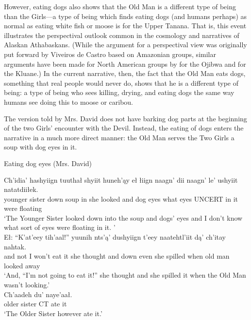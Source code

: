 However, eating dogs also shows that the Old Man is a different type of being than the Girls—a type of being which finds eating dogs (and humans perhaps) as normal as eating white fish or moose is for the Upper Tanana. That is, this event illustrates the perspectival \citep{ViveirosDeCastroE1998} outlook common in the cosmology and narratives of Alaskan Athabaskans. (While the argument for a perspectival view was originally put forward by Viveiros de Castro based on Amazonian groups, similar arguments have been made for North American groups by \citet{IngoldT2000} for the Ojibwa and \citet{NadasdyP2003} for the Kluane.) In the current narrative, then, the fact that the Old Man eats dogs, something that real people would never do, shows that he is a different type of being: a type of being who sees killing, drying, and eating dogs the same way humans see doing this to moose or caribou.

The version told by Mrs. David does not have barking dog parts at the beginning of the two Girls' encounter with the Devil. Instead, the eating of dogs enters the narrative in a much more direct manner: the Old Man serves the Two Girls a soup with dog eyes in it.

\begin{exe}
\ex Eating dog eyes (Mrs. David) \label{brucks:cdavid-dogs-eyes}
\begin{xlist}

\ex \gll Ch'idia' hashyiign tuuthał shyiit huneh'ąy eł łiign naagn' dii naagn' le' ushyiit natatdiiłek.   \\
 {younger sister} down soup in {she looked} and dog eyes what eyes UNCERT {in it} {were floating} \\
\glt `The Younger Sister looked down into the soup and dogs' eyes and I don't know what sort of eyes were floating in it. ' \\

\ex \gll Eł: ``K'at'eey tih'aal!'' yuunih nts'ą' dushyiign t'eey naatehtl'iit dą' ch'itay nahtak.  \\
 and not {I won't eat it} {she thought} and down even {she spilled} when {old man} {looked away}  \\
\glt `And, ``I'm not going to eat it!'' she thought and she spilled it when the Old Man wasn't looking.' \\

\ex \gll  Ch'aadeh du' naye'aał.  \\
 {older sister} CT {ate it} \\
\glt `The Older Sister however ate it.' \\
\end{xlist}
\end{exe}

